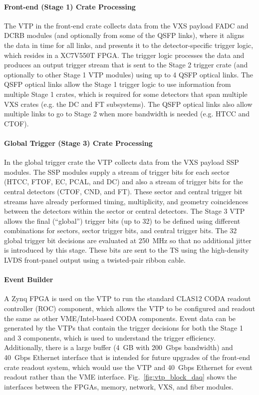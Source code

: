 \paragraph{Front-end (Stage 1) Crate Processing}
The VTP in the front-end crate collects data from the VXS payload FADC and DCRB modules (and optionally from some of the QSFP links), where it aligns the data in time for all links, and presents it to the detector-specific trigger logic, which resides in a XC7V550T FPGA. The trigger logic processes the data and produces an output trigger stream that is sent to the Stage 2 trigger crate (and optionally to other Stage 1 VTP modules) using up to 4 QSFP optical links. The QSFP optical links allow the Stage 1 trigger logic to use information from multiple Stage 1 crates, which is required for some detectors that span multiple VXS crates (e.g. the DC and FT subsystems). The QSFP optical links also allow multiple links to go to Stage 2 when more bandwidth is needed (e.g. HTCC and CTOF).

\paragraph{Global Trigger (Stage 3) Crate Processing}
In the global trigger crate the VTP collects data from the VXS payload SSP modules. The SSP modules supply a stream of trigger bits for each sector (HTCC, FTOF, EC, PCAL, and DC) and also a stream of trigger bits for the central detectors (CTOF, CND, and FT). These sector and central trigger bit streams have already performed timing, multiplicity, and geometry coincidences between the detectors within the sector or central detectors. The Stage 3 VTP allows the final (``global'') trigger bits (up to 32) to be defined using different combinations for sectors, sector trigger bits, and central trigger bits. The 32 global trigger bit decisions are evaluated at 250~MHz so that no additional jitter is introduced by this stage. These bits are sent to the TS using the high-density LVDS front-panel output using a twisted-pair ribbon cable.

\paragraph{Event Builder}
A Zynq FPGA is used on the VTP to run the standard CLAS12 CODA readout controller (ROC) component, which allows the VTP to be configured and readout the same as other VME/Intel-based CODA components. Event data can be generated by the VTPs that contain the trigger decisions for both the Stage 1 and 3 components, which is used to understand the trigger efficiency. Additionally, there is a large buffer (4~GB with 200~Gbps bandwidth) and 40~Gbps Ethernet interface that is intended for future upgrades of the front-end crate readout system, which would use the VTP and 40~Gbps Ethernet for event readout rather than the VME interface. Fig.~\ref{fig:vtp_block_daq} shows the interfaces between the FPGAs, memory, network, VXS, and fiber modules.

